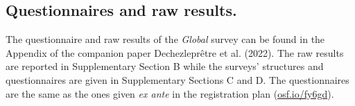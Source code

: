 \documentclass{nature}
\begin{document}
\begin{methods}
\subsection{\small Questionnaires and raw results.} %
The questionnaire and raw results of the \textit{Global} survey can be found in the Appendix of the companion paper Dechezleprêtre et al. (2022).\cite{dechezlepretre_fighting_2022} %
The raw results are reported in Supplementary Section B %
while the surveys' structures and questionnaires are given in Supplementary Sections C and D. The questionnaires are the same as the ones given \textit{ex ante} in the registration plan (\href{https://osf.io/fy6gd}{osf.io/fy6gd}).



\end{methods}
\end{document}
